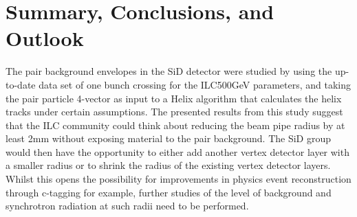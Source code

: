 \section{Summary, Conclusions, and Outlook}
The pair background envelopes in the SiD detector were studied by using the up-to-date \guineapig data set of one bunch crossing for the ILC500GeV parameters, and taking the pair particle 4-vector as input to a Helix algorithm that calculates the helix tracks under certain assumptions.
The presented results from this study suggest that the ILC community could think about reducing the beam pipe radius by at least \unit{2}{mm} without exposing material to the pair background.
The SiD group would then have the opportunity to either add another vertex detector layer with a smaller radius or to shrink the radius of the existing vertex detector layers.
Whilst this opens the possibility for improvements in physics event reconstruction through c-tagging for example, further studies of the level of background and synchrotron radiation at such
radii need to be performed.
